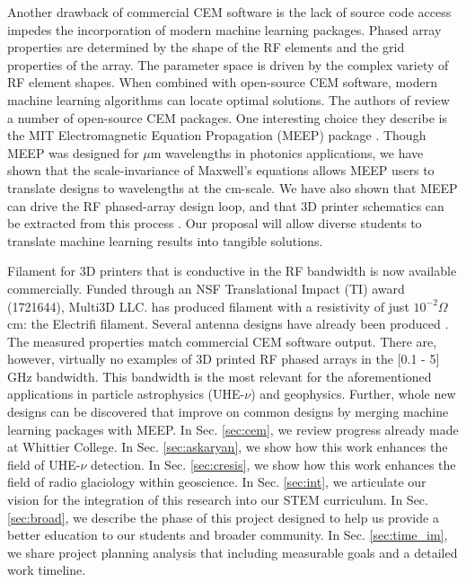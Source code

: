 \documentclass[11pt]{amsart}
\begin{document}
Another drawback of commercial CEM software is the lack of source code access impedes the incorporation of modern machine learning packages.  Phased array properties are determined by the shape of the RF elements and the grid properties of the array.  The parameter space is driven by the complex variety of RF element shapes.  When combined with open-source CEM software, modern machine learning algorithms can locate optimal solutions.  The authors of \cite{10.3390/electronics8121506} review a number of open-source CEM packages.  One interesting choice they describe is the MIT Electromagnetic Equation Propagation (MEEP) package \cite{10.1016/j.cpc.2009.11.008}.  Though MEEP was designed for $\mu$m wavelengths in photonics applications, we have shown that the scale-invariance of Maxwell's equations allows MEEP users to translate designs to wavelengths at the cm-scale.  We have also shown that MEEP can drive the RF phased-array design loop, and that 3D printer schematics can be extracted from this process \cite{electronics10040415,meepcon2022,10.1016/j.cpc.2009.11.008}.  Our proposal will allow diverse students to translate machine learning results into tangible solutions.  

Filament for 3D printers that is conductive in the RF bandwidth is now available commercially.  Funded through an NSF Translational Impact (TI) award (1721644), Multi3D LLC. has produced filament with a resistivity of just $10^{-2} \Omega$ cm: the Electrifi filament.  Several antenna designs have already been produced \cite{8786183,10.1049/iet-map.2017.0104}.  The measured properties match commercial CEM software output.  There are, however, virtually no examples of 3D printed RF phased arrays in the [0.1 - 5] GHz bandwidth.  This bandwidth is the most relevant for the aforementioned applications in particle astrophysics (UHE-$\nu$) and geophysics.  Further, whole new designs can be discovered that improve on common designs by merging machine learning packages with MEEP.  In Sec. \ref{sec:cem}, we review progress already made at Whittier College.  In Sec. \ref{sec:askaryan}, we show how this work enhances the field of UHE-$\nu$ detection.  In Sec. \ref{sec:cresis}, we show how this work enhances the field of radio glaciology within geoscience.  In Sec. \ref{sec:int}, we articulate our vision for the integration of this research into our STEM curriculum.  In Sec. \ref{sec:broad}, we describe the phase of this project designed to help us provide a better education to our students and broader community.  In Sec. \ref{sec:time_im}, we share project planning analysis that including measurable goals and a detailed work timeline.
\end{document}
